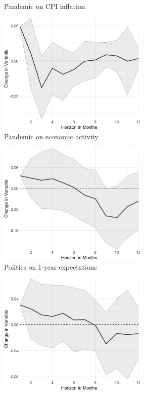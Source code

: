 \begin{figure}
\begin{subfigure}{00.24\textwidth}
		\caption{Pandemic on CPI inflation}
	\end{subfigure}
	\begin{subfigure}{00.24\textwidth}
		\includegraphics[width=0.8\textwidth]{output/lp/baseline/bHP/pandemic/pandemiconeconac_djn.eps}
		\caption{Pandemic on economic activity}
	\end{subfigure}
	\begin{subfigure}{00.24\textwidth}
		\includegraphics[width=0.8\textwidth]{output/lp/baseline/bHP/politics/politicsonexpectations1y_djn.eps}
		\caption{Politics on 1-year expectations}
	\end{subfigure}
	\begin{subfigure}{00.24\textwidth}
		\includegraphics[width=0.8\textwidth]{output/lp/baseline/bHP/politics/politicsonexpectations3y_djn.eps}

\end{subfigure}
\end{figure}
